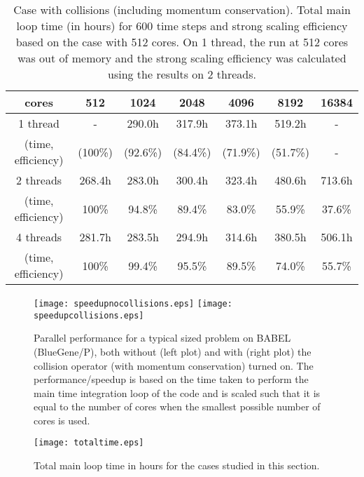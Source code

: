 \begin{small}
\begin{table}
\begin{center}
\begin{tabular}{|c|c|c|c|c|c|c|}
\hline
cores & 512 & 1024 & 2048 & 4096 & 8192 & 16384\\
\hline
1 thread& - & 290.0h & 317.9h & 373.1h & 519.2h & - \\
(time, efficiency) & (100\%) & (92.6\%)  & (84.4\%)  & (71.9\%)& (51.7\%) & - \\
\hline
2 threads & 268.4h & 283.0h & 300.4h& 323.4h & 480.6h & 713.6h \\
(time, efficiency) & 100\% & 94.8\%  & 89.4\%  & 83.0\%& 55.9\% & 37.6\%\\
\hline
4 threads & 281.7h & 283.5h & 294.9h & 314.6h & 380.5h & 506.1h \\
(time, efficiency) & 100\% & 99.4\%  & 95.5\%  & 89.5\% & 74.0\% & 55.7\%\\
\hline
\end{tabular}
\caption{Case with collisions (including momentum conservation). Total main loop time (in hours) for 600 time steps and strong scaling efficiency based on the case with 512 cores. On 1 thread, the run at 512 cores was out of memory and the strong scaling efficiency was calculated using the results on 2 threads. }
\label{table:col}
\end{center}
\end{table}
\end{small}

\begin{figure}
\begin{center}
\texttt{[image: speedupnocollisions.eps]}%
\texttt{[image: speedupcollisions.eps]}
\caption{ Parallel performance for a typical sized problem on BABEL (BlueGene/P), both without (left plot) and 
  with (right plot) the collision operator (with momentum conservation) turned on. The performance/speedup is based on the
  time taken to perform the main time integration loop of the code and is scaled such that it is equal
  to the number of cores when the smallest possible number of cores is used.}
\label{scalingBABEL}
\end{center}
\end{figure}
\begin{figure}
\begin{center}
\texttt{[image: totaltime.eps]}
\caption{ Total main loop time in hours for the cases studied in this section.}
\label{scalingBABEL:total}
\end{center}
\end{figure}

